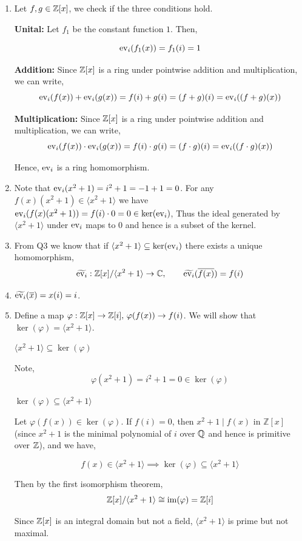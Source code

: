 \documentclass[Notebook.tex]{subfiles}
\begin{document}
\begin{solution}
    \bbni
    \begin{enumerate}[label=(\alph*),ref=\theenumi\alph*]
        \item Let $f, g \in \mathbb Z[x]$, we check if the three conditions hold. 
        
        \textbf{Unital:} Let $f_1$ be the constant function $1$. Then, 

        \[\operatorname{ev}_i (f_1 (x)) = f_1(i) = 1\]

        \textbf{Addition:} 
        Since $\mathbb Z[x]$ is a ring under pointwise addition and multiplication, we can write, 
        \[\operatorname{ev}_i(f(x)) + \operatorname{ev}_i(g(x)) = f(i) + g(i) = (f+g)(i) = \operatorname{ev}_i((f+g)(x))\]

        \textbf{Multiplication:} 
        Since $\mathbb Z[x]$ is a ring under pointwise addition and multiplication, we can write, 
        \[\operatorname{ev}_i(f(x)) \cdot \operatorname{ev}_i(g(x)) = f(i) \cdot g(i) = (f\cdot g)(i) = \operatorname{ev}_i((f\cdot g)(x))\]

        Hence, $\operatorname{ev}_i$ is a ring homomorphism. 

        \item Note that $\operatorname{ev}_i(x^2 + 1) = i^2 + 1 = - 1 + 1 = 0$. For any $f(x) (x^2+1) \in \langle x^2+ 1\rangle$ we have $\operatorname{ev}_i(f(x) (x^2+1)) = f(i) \cdot 0 = 0 \in \ker(\operatorname{ev}_i)$, Thus the ideal generated by $\langle x^2 + 1 \rangle$ under $\operatorname{ev}_i$ maps to $0$ and hence is a subset of the kernel. 
        
        \item From  Q3 we know that if $\langle x^2 + 1 \rangle \subseteq \ker(\operatorname{ev}_i)$ there exists a unique homomorphism,
         \[\widetilde{\operatorname{ev}_i}: \mathbb Z[x]/\langle x^2 +1 \rangle \to \mathbb C, \qquad \widetilde {\operatorname{ev}_i}(\overline{f(x)}) = f(i)\] 
        
        \item  $\widetilde{\operatorname{ev}_i} (\overline{x}) = x(i) = i$.
        
        \item Define a map $\varphi: \mathbb Z[x] \to \mathbb Z[i], \, \varphi(f(x)) \to f(i)$. We will show that $\ker(\varphi) = \langle x^2 + 1 \rangle$. 
        
        $\langle x^2 + 1 \rangle \subseteq \ker(\varphi)$
        
        Note,
        \[\varphi(x^2 + 1) = i^2+ 1 = 0 \in \ker(\varphi)\]

        $\ker(\varphi) \subseteq \langle x^2 + 1 \rangle$

        Let $\varphi(f(x)) \in \ker(\varphi)$. If $f(i)=0$, then $x^2+1 \mid f(x)$ in $\mathbb{Z}[x]$ (since $x^2+1$ is the minimal polynomial of $i$ over $\mathbb Q$ and hence is primitive over $\mathbb Z$), and we have, 

        \[f(x) \in \langle x^2 + 1 \rangle  \implies \ker(\varphi) \subseteq \langle x^2 + 1 \rangle\]

        Then by the first isomorphism theorem, 
        \[\mathbb Z[x]/\langle x^2 + 1 \rangle \cong \operatorname{im}(\varphi) = \mathbb Z[i]\]
        
        Since $\mathbb Z[x]$ is an integral domain but not a field, $\langle x^2+ 1 \rangle$ is prime but not maximal.
    \end{enumerate}
\end{solution}
\end{document}
